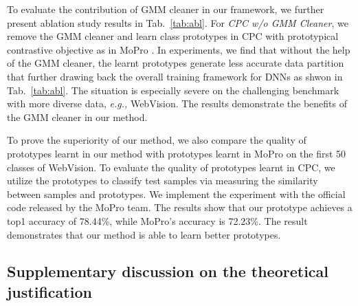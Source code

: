 \documentclass{article} \usepackage{iclr2023_conference,times}
\begin{document}
  To evaluate the contribution of GMM cleaner in our framework, we further present ablation study results in Tab.~\ref{tab:abl}. For \emph{CPC w/o GMM Cleaner}, we remove the GMM cleaner and learn class prototypes in CPC with prototypical contrastive objective as in MoPro \citep{li2020mopro}. In experiments, we find that without the help of the GMM cleaner, the learnt prototypes generate less accurate data partition that further drawing back the overall training framework for DNNs as shwon in Tab.~\ref{tab:abl}. The situation is especially severe on the challenging benchmark with more diverse data, \emph{e.g.,} WebVision.  The results demonstrate the benefits of the GMM cleaner in our method. 
  
  To prove the superiority of our method, we also compare the quality of prototypes learnt in our method with prototypes learnt in MoPro \citep{li2020mopro} on the first 50 classes of WebVision.
  To evaluate the quality of prototypes learnt in CPC, we utilize the prototypes to classify test samples via measuring the similarity between samples and prototypes. We implement the experiment with the official code released by the MoPro team. The results show that our prototype achieves a top1 accuracy of 78.44\%, while MoPro's accuracy is 72.23\%. The result demonstrates that our method is able to learn better prototypes.
  
\begin{table}[]
\caption{Ablation study on the contribution of GMM cleaner.The classification accuracy of DNNs is reported. The best results are indicated with  boldface.}\label{tab:abl}
\end{table}

\subsection{Supplementary discussion on the theoretical justification}
\label{app:kl}
\end{document}
